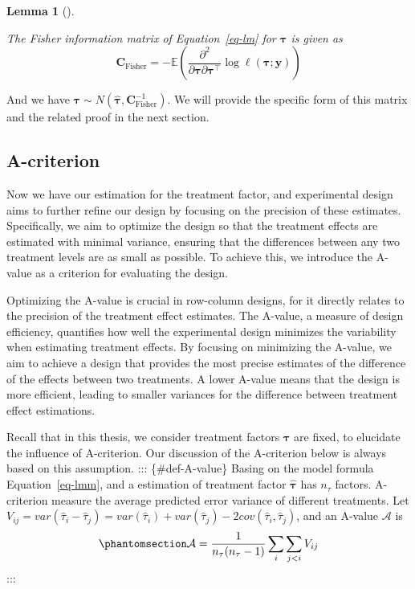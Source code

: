 \documentclass[
  a4paper,
  oneside,
  openany,
  12pt,
  onecolumn]{book}
\theoremstyle{definition}
\theoremstyle{definition}
\theoremstyle{plain}
\newtheorem{lemma}{Lemma}[chapter]
\theoremstyle{remark}
\begin{document}
\begin{lemma}[]\protect\hypertarget{lem-fim-lm}{}\label{lem-fim-lm}

The Fisher information matrix of Equation~\ref{eq-lm} for
\(\boldsymbol{\tau}\) is given as \[
\boldsymbol{C}_{\text{Fisher}} = -\mathbb{E}\left(\frac{\partial^2}{\partial\boldsymbol{\tau}\partial\boldsymbol{\tau}^\top}\log\ell(\boldsymbol{\tau};\boldsymbol{y})\right)
\]

\end{lemma}

And we have
\(\boldsymbol{\tau}\sim N(\hat{\boldsymbol{\tau}},\boldsymbol{C}_{\text{Fisher}}^{-1})\).
We will provide the specific form of this matrix and the related proof
in the next section.

\subsection{A-criterion}\label{a-criterion}

Now we have our estimation for the treatment factor, and experimental
design aims to further refine our design by focusing on the precision of
these estimates. Specifically, we aim to optimize the design so that the
treatment effects are estimated with minimal variance, ensuring that the
differences between any two treatment levels are as small as possible.
To achieve this, we introduce the A-value as a criterion for evaluating
the design.

Optimizing the A-value is crucial in row-column designs, for it directly
relates to the precision of the treatment effect estimates. The A-value,
a measure of design efficiency, quantifies how well the experimental
design minimizes the variability when estimating treatment effects. By
focusing on minimizing the A-value, we aim to achieve a design that
provides the most precise estimates of the difference of the effects
between two treatments. A lower A-value means that the design is more
efficient, leading to smaller variances for the difference between
treatment effect estimations.

Recall that in this thesis, we consider treatment factors
\(\boldsymbol{\tau}\) are fixed, to elucidate the influence of
A-criterion. Our discussion of the A-criterion below is always based on
this assumption. ::: \{\#def-A-value\} Basing on the model formula
Equation~\ref{eq-lmm}, and a estimation of treatment factor
\(\hat{\boldsymbol{\tau}}\) has \(n_{\tau}\) factors. A-criterion
measure the average predicted error variance of different treatments.
Let
\(V_{ij}= var(\hat{\tau}_i-\hat{\tau}_j)=var(\hat{\tau}_i)+var(\hat{\tau}_j)-2cov(\hat{\tau}_i,\hat{\tau}_j)\),
and an A-value \(\mathcal{A}\) is
\begin{equation}\phantomsection\label{eq-a}{
\mathcal{A}=\frac{1}{n_{\tau}(n_{\tau}-1)}\sum_{i}\sum_{j<i}V_{ij}
}\end{equation} :::
\end{document}

